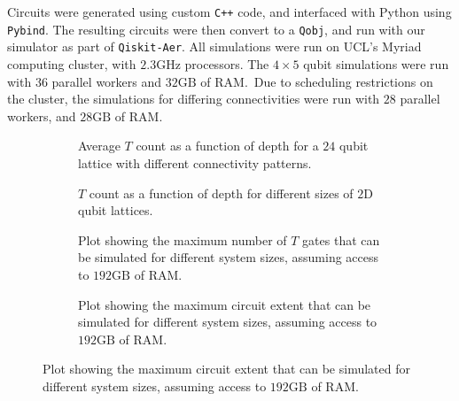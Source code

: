 Circuits were generated using custom \texttt{C++} code, and interfaced with Python using \texttt{Pybind}. The resulting circuits were then convert to a \texttt{Qobj}, and run with our simulator as part of \texttt{Qiskit-Aer}. All simulations were run on UCL's Myriad computing cluster, with $2.3\mathrm{GHz}$ processors. The $4\times5$ qubit simulations were run with $36$ parallel workers and $32\mathrm{GB}$ of RAM.\ Due to scheduling restrictions on the cluster, the simulations for differing connectivities were run with $28$ parallel workers, and $28\mathrm{GB}$ of RAM.
\begin{figure}[H]
\centering
\caption{Resource Analysis of Google circuits on a $20$ qubit lattice.}\label{fig:rc_resources}
\begin{subfigure}[t]{0.48\textwidth}
\begin{scaletikzpicturetowidth}{\textwidth}

\end{scaletikzpicturetowidth}
\caption{Average $T$ count as a function of depth for a $24$ qubit lattice with different connectivity patterns.}\label{fig:t_count_depth}
\end{subfigure}
\begin{subfigure}[t]{0.48\textwidth}
\begin{scaletikzpicturetowidth}{\textwidth}

\end{scaletikzpicturetowidth}
\caption{$T$ count as a function of depth for different sizes of $2$D qubit lattices.}\label{fig:t_count_connectivity}
\end{subfigure}
\begin{subfigure}[t]{0.48\textwidth}
\begin{scaletikzpicturetowidth}{\textwidth}

\end{scaletikzpicturetowidth}
\caption{Plot showing the maximum number of $T$ gates that can be simulated for different system sizes, assuming access to $192\mathrm{GB}$ of RAM.}\label{fig:max_t_bar}
\end{subfigure}
\begin{subfigure}[t]{0.48\textwidth}
\begin{scaletikzpicturetowidth}{\textwidth}

\end{scaletikzpicturetowidth}
\caption{Plot showing the maximum circuit extent that can be simulated for different system sizes, assuming access to $192\mathrm{GB}$ of RAM.}\label{fig:max_extent_bar}
\end{subfigure}
\end{figure}
